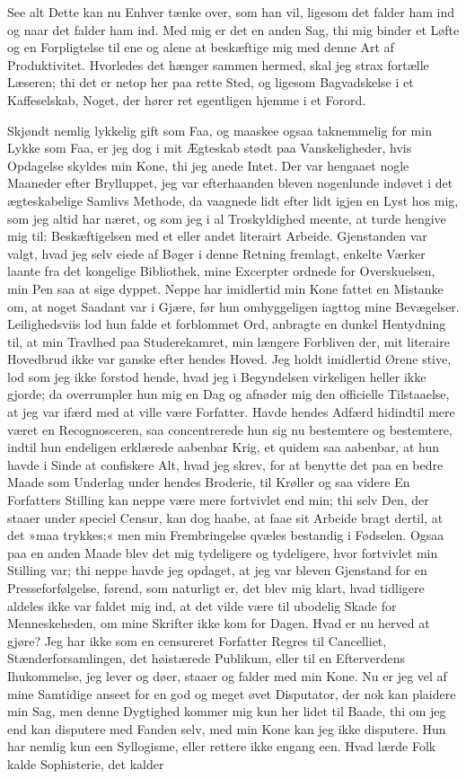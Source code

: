 \documentclass[12pt,a4paper]{article}
\begin{document}
See alt Dette kan nu Enhver tænke over, som han vil, ligesom det falder ham ind og naar det falder ham ind. Med mig er det en anden Sag, thi mig binder et Løfte og en Forpligtelse til ene og alene at beskæftige mig med denne Art af Produktivitet. Hvorledes det hænger sammen hermed, skal jeg strax fortælle Læseren; thi det er netop her paa rette Sted, og ligesom Bagvadskelse i et Kaffeselskab, Noget, der hører ret egentligen hjemme i et Forord.

Skjøndt nemlig lykkelig gift som Faa, og maaskee ogsaa taknemmelig for min Lykke som Faa, er jeg dog i mit Ægteskab stødt paa Vanskeligheder, hvis Opdagelse skyldes min Kone, thi jeg anede Intet. Der var hengaaet nogle Maaneder efter Brylluppet, jeg var efterhaanden bleven nogenlunde indøvet i det ægteskabelige Samlivs Methode, da vaagnede lidt efter lidt igjen en Lyst hos mig, som jeg altid har næret, og som jeg i al Troskyldighed meente, at turde hengive mig til: Beskæftigelsen med et eller andet literairt Arbeide. Gjenstanden var valgt, hvad jeg selv eiede af Bøger i denne Retning fremlagt, enkelte Værker laante fra det kongelige Bibliothek, mine Excerpter ordnede for Overskuelsen, min Pen saa at sige dyppet. Neppe har imidlertid min Kone fattet en Mistanke om, at noget Saadant var i Gjære, før hun omhyggeligen iagttog mine Bevægelser. Leilighedsviis lod hun falde et forblommet Ord, anbragte en dunkel Hentydning til, at min Travlhed paa Studerekamret, min længere Forbliven der, mit literaire Hovedbrud ikke var ganske efter hendes Hoved. Jeg holdt imidlertid Ørene stive, lod som jeg ikke forstod hende, hvad jeg i Begyndelsen virkeligen heller ikke gjorde; da overrumpler hun mig en Dag og afnøder mig den officielle Tilstaaelse, at jeg var ifærd med at ville være Forfatter. Havde hendes Adfærd hidindtil mere været en Recognosceren, saa concentrerede hun sig nu bestemtere og bestemtere, indtil hun endeligen erklærede aabenbar Krig, et quidem saa aabenbar, at hun havde i Sinde at confiskere Alt, hvad jeg skrev, for at benytte det paa en bedre Maade som Underlag under hendes Broderie, til Krøller og saa videre En Forfatters Stilling kan neppe være mere fortvivlet end min; thi selv Den, der staaer under speciel Censur, kan dog haabe, at faae sit Arbeide bragt dertil, at det »maa trykkes;« men min Frembringelse qvæles bestandig i Fødselen. Ogsaa paa en anden Maade blev det mig tydeligere og tydeligere, hvor fortvivlet min Stilling var; thi neppe havde jeg opdaget, at jeg var bleven Gjenstand for en Presseforfølgelse, førend, som naturligt er, det blev mig klart, hvad tidligere aldeles ikke var faldet mig ind, at det vilde være til ubodelig Skade for Menneskeheden, om mine Skrifter ikke kom for Dagen. Hvad er nu herved at gjøre? Jeg har ikke som en censureret Forfatter Regres til Cancelliet, Stænderforsamlingen, det høistærede Publikum, eller til en Efterverdens Ihukommelse, jeg lever og døer, staaer og falder med min Kone. Nu er jeg vel af mine Samtidige anseet for en god og meget øvet Disputator, der nok kan plaidere min Sag, men denne Dygtighed kommer mig kun her lidet til Baade, thi om jeg end kan disputere med Fanden selv, med min Kone kan jeg ikke disputere. Hun har nemlig kun een Syllogisme, eller rettere ikke engang een. Hvad lærde Folk kalde Sophisterie, det kalder 
\end{document}
